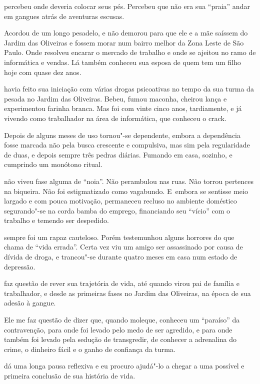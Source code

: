  percebeu onde deveria colocar seus pés. Percebeu que não era sua
``praia'' andar em gangues atrás de aventuras escusas.

Acordou de um longo pesadelo, e não demorou para que ele e a mãe saíssem
do Jardim das Oliveiras e fossem morar num bairro melhor da Zona Leste
de São Paulo. Onde  resolveu encarar o mercado de trabalho e onde se
ajeitou no ramo de informática e vendas. Lá também conheceu sua esposa
de quem tem um filho hoje com quase dez anos.

\asterisc{}

 havia feito sua iniciação com várias drogas psicoativas no tempo da
sua turma da pesada no Jardim das Oliveiras. Bebeu, fumou maconha,
cheirou lança e experimentou farinha branca. Mas foi com vinte cinco
anos, tardiamente, e já vivendo como trabalhador na área de informática,
que conheceu o crack.

Depois de alguns meses de uso tornou"-se dependente, embora a dependência
fosse marcada não pela busca crescente e compulsiva, mas sim pela
regularidade de duas, e depois sempre três pedras diárias. Fumando em
casa, sozinho, e cumprindo um monótono ritual.

 não viveu fase alguma de ``noia''. Não perambulou nas ruas. Não
torrou pertences na biqueira. Não foi estigmatizado como vagabundo. E~embora se sentisse meio largado e com pouca motivação, permaneceu
recluso no ambiente doméstico segurando"-se na corda bamba do emprego,
financiando seu ``vício'' com o trabalho e temendo ser despedido.

 sempre foi um rapaz cauteloso. Porém testemunhou alguns horrores do
que chama de ``vida errada''. Certa vez viu um amigo ser assassinado por
causa de dívida de droga, e trancou"-se durante quatro meses em casa num
estado de depressão.

\asterisc{}

 faz questão de rever sua trajetória de vida, até quando virou pai de
família e trabalhador, e desde as primeiras fases no Jardim das
Oliveiras, na época de sua adesão à gangue.

Ele me faz questão de dizer que, quando moleque, conheceu um ``paraíso''
da contravenção, para onde foi levado pelo medo de ser agredido, e para
onde também foi levado pela sedução de transgredir, de conhecer a
adrenalina do crime, o dinheiro fácil e o ganho de confiança da turma.

\asterisc{}

 dá uma longa pausa reflexiva e eu procuro ajudá"-lo a chegar a uma
possível e primeira conclusão de sua história de vida.

